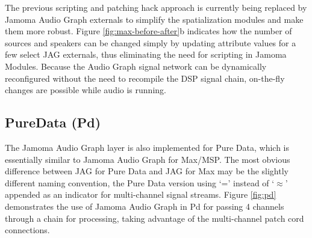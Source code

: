 \documentclass[twoside,a4paper]{article}
\begin{document}
The previous scripting and patching hack approach is currently being replaced by Jamoma Audio Graph externals to simplify the spatialization modules and make them more robust.
Figure \ref{fig:max-before-after}b indicates how the number of sources and speakers can be changed simply by updating attribute values for a few select JAG externals, thus eliminating the need for scripting in Jamoma Modules.
Because the Audio Graph signal network can be dynamically reconfigured without the need to recompile the DSP signal chain, on-the-fly changes are possible while audio is running.





\subsection{PureData (Pd)} %

The Jamoma Audio Graph layer is also implemented for Pure Data, which is essentially similar to Jamoma Audio Graph for Max/MSP. 
The most obvious difference between JAG for Pure Data and JAG for Max may be the slightly different naming convention, the Pure Data version using `=' instead of `$\approx$' appended as an indicator for multi-channel signal streams. 
Figure \ref{fig:pd} demonstrates the use of Jamoma Audio Graph in Pd for passing 4 channels through a chain for processing, taking advantage of the multi-channel patch cord connections.  
\end{document}
